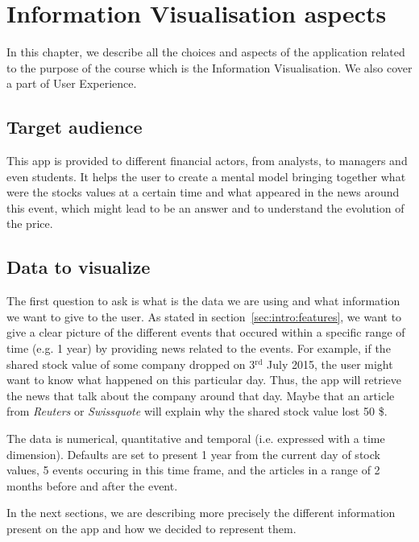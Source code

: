 \chapter{Information Visualisation aspects}
\label{chapter:iv}
In this chapter, we describe all the choices and aspects of the application related to the purpose of the course which is the Information Visualisation. We also cover a part of User Experience.

\section{Target audience}
This app is provided to different financial actors, from analysts, to managers and even students. It helps the user to create a mental model bringing together what were the stocks values at a certain time and what appeared in the news around this event, which might lead to be an answer and to understand the evolution of the price.

\section{Data to visualize}
The first question to ask is what is the data we are using and what information we want to give to the user. As stated in section~\ref{sec:intro:features}, we want to give a clear picture of the different events that occured within a specific range of time (e.g. 1 year) by providing news related to the events.
For example, if the shared stock value of some company dropped on 3$^{\text{rd}}$ July 2015, the user might want to know what happened on this particular day. Thus, the app will retrieve the news that talk about the company around that day. Maybe that an article from \textit{Reuters} or \textit{Swissquote} will explain why the shared stock value lost 50 \$.

The data is numerical, quantitative and temporal (i.e. expressed with a time dimension). Defaults are set to present 1 year from the current day of stock values, 5 events occuring in this time frame, and the articles in a range of 2 months before and after the event.

In the next sections, we are describing more precisely the different information present on the app and how we decided to represent them.

